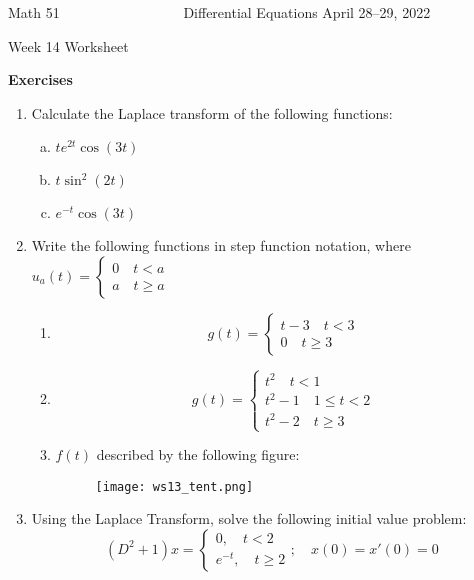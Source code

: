 \documentclass[12pt]{article}
\begin{document}

\noindent
Math 51~~~~~~~~~~~~~~~~~ \hfill Differential Equations \hfill April 28--29, 2022 
\centerline{Week 14 Worksheet}

\bigskip
\noindent

\bigskip
\begin{center}
  \textbf{Exercises}
  \end{center}


\begin{enumerate}
  \setlength{\itemsep}{2mm}
\item Calculate the Laplace transform of the following functions:
\begin{enumerate}[(a)]
\item $te^{2t}\cos(3t)$
\bigskip
\bigskip
\bigskip
\bigskip

\item $t\sin^2(2t)$
\bigskip
\bigskip
\bigskip
\bigskip

\item $e^{-t}\cos(3t)$
\bigskip
\bigskip
\bigskip
\bigskip

\end{enumerate}
\item Write the following functions in step function notation, where  $u_a(t) = \left\{\begin{aligned} 0 \quad t<a\\
a\quad t\geq a \end{aligned}  \right.$
\begin{enumerate}
\item 
\begin{equation*}
g(t) =  \left\{\begin{aligned} t-3 \quad t<3\\
0\quad t\geq 3 \end{aligned}  \right.
\end{equation*}
\bigskip
\bigskip
\bigskip
\bigskip
\item 
\begin{equation*}
g(t) =  \left\{\begin{aligned} t^2 \quad t<1\\
t^2-1\quad 1\leq t<2  \\
t^2-2\quad t\geq 3 \end{aligned}  \right.
\end{equation*}
\bigskip
\bigskip
\bigskip
\bigskip
\newpage
\item $f(t)$ described by the following figure:
\begin{figure}[h!]
\centering
\texttt{[image: ws13\_tent.png]}
\end{figure}
\end{enumerate}
\bigskip
\bigskip
\bigskip
\bigskip
\bigskip
\bigskip
\bigskip
\bigskip
\bigskip
\bigskip
\bigskip
\bigskip
\item Using the Laplace Transform, solve the following initial value problem:
\begin{equation*}
(D^2+1)x = \left\{\begin{aligned}
0,\quad t<2\\
e^{-t},\quad t\geq 2
\end{aligned} \right.;\quad x(0)=x'(0)=0
\end{equation*}
\end{enumerate}
\end{document}
